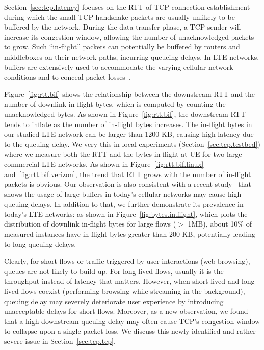 
\label{sec:tcp.queue}

Section~\ref{sec:tcp.latency} focuses on the RTT of TCP connection establishment during which the small TCP handshake packets are usually unlikely to be buffered by the network. During the data transfer phase, a TCP sender will increase its congestion window, allowing the number of unacknowledged packets to grow. Such ``in-flight'' packets can potentially be buffered by routers and middleboxes on their network paths, incurring queueing delays. In LTE networks, buffers are extensively used to accommodate the varying cellular network conditions and to conceal packet losses~\cite{4gbook}.

Figure~\ref{fig:rtt.bif} shows the relationship between the downstream RTT and the number of downlink in-flight bytes, which is computed by counting the unacknowledged bytes. As shown in Figure~\ref{fig:rtt.bif}, the downstream RTT tends to inflate as the number of in-flight bytes increases. The in-flight bytes in our studied LTE network can be larger than 1200 KB, causing high latency due to the queuing delay. We very this in local experiments (Section~\ref{sec:tcp.testbed}) where we measure both the RTT and the bytes in flight at UE for two large commercial LTE networks. As shown in Figure~\ref{fig:rtt.bif.linux} and~\ref{fig:rtt.bif.verizon}, the trend that RTT grows with the number of in-flight packets is obvious. Our observation is also consistent with a recent study~\cite{jiang12} that shows the usage of large buffers in today's cellular networks may cause high queuing delays. In addition to that, we further demonstrate its prevalence in today's LTE networks: as shown in Figure~\ref{fig:bytes.in.flight}, which plots the distribution of downlink in-flight bytes for large flows ($>$ 1MB), about 10\% of measured instances have in-flight bytes greater than 200 KB, potentially leading to long queuing delays.

Clearly, for short flows or traffic triggered by user interactions (\eg web browsing), queues are not likely to build up. For long-lived flows, usually it is the throughput instead of latency that matters. However, when short-lived and long-lived flows coexist (\eg performing browsing while streaming in the background), queuing delay may severely deteriorate user experience by introducing unacceptable delays for short flows. Moreover, as a new observation, we found that a high downstream queuing delay may often cause TCP's congestion window to collapse upon a single packet loss. We discuss this newly identified and rather severe issue in Section~\ref{sec:tcp.tcp}.

